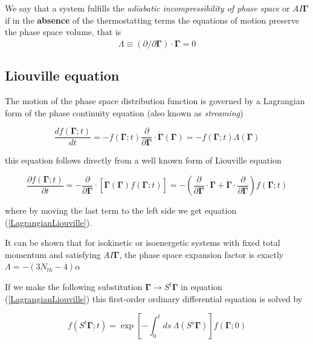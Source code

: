 \documentclass[a4paper,12pt,nofootinbib]{article}
\begin{document}
We say that a system fulfills the \textit{adiabatic incompressibility of phase space} or $AI\bm{\Gamma}$ if in the \textbf{absence} of the thermostatting terms the equations of motion preserve the phase space volume, that is
\begin{equation}
  \Lambda \equiv (\partial / \partial\bm{\Gamma}) \cdot \dot{\bm{\Gamma}}=0
\end{equation}


\subsection{Liouville equation}

The motion of the phase space distribution function is governed by a Lagrangian form of the phase continuity equation (also known as \textit{streaming})

\begin{equation}
\label{LagrangianLiouville}
  \frac{df(\bm{\Gamma};t)}{dt}=-f(\bm{\Gamma};t)\frac{\partial}{\partial \bm{\Gamma}} \cdot \dot{\bm{\Gamma}}(\bm{\Gamma}) = -f(\bm{\Gamma};t)\Lambda(\bm{\Gamma})
\end{equation}

this equation follows directly from a well known form of Liouville equation

\begin{equation}
    \frac{\partial f(\bm{\Gamma};t) }{\partial t}
    = -\frac{\partial}{\partial \bm{\Gamma}} \cdot [\dot{\bm{\Gamma}}(\bm{\Gamma}) f(\bm{\Gamma};t)]
     = -(\frac{\partial}{\partial \bm{\Gamma}} \cdot \dot{\bm{\Gamma}} + \dot{\bm{\Gamma}} \cdot \frac{\partial}{\partial \bm{\Gamma}}) f(\bm{\Gamma};t)
\end{equation}

where by moving the last term to the left side we get equation (\ref{LagrangianLiouville}).


It can be shown that for isokinetic or isoenergetic systems with fixed total momentum and satisfying $AI\bm{\Gamma}$, the phase space expansion factor is exactly $\Lambda = - (3N_{th} -4) \alpha $ 

If we make the following substitution $\bm{\Gamma} \to S^t\bm{\Gamma}$ in equation (\ref{LagrangianLiouville}) this first-order ordinary differential equation is solved by

\begin{equation}
\label{distributionStreaming}
  f(S^t\bm{\Gamma};t)=\exp[-\int_0^t ds\ \Lambda(S^s\bm{\Gamma})]f(\bm{\Gamma};0)
\end{equation}
\end{document}
